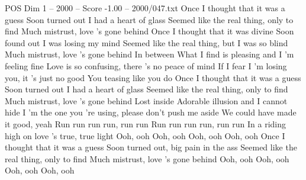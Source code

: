 \begin{textsample}{POS Dim 1 – 2000 – Score -1.00 – 2000/047.txt}  \label{ex:f1_pos_036}
Once I thought that it was a guess Soon turned out I had a heart of glass Seemed like the real thing, only to find Much mistrust, love 's gone behind Once I thought that it was divine Soon found out I was losing my mind Seemed like the real thing, but I was so blind Much mistrust, love 's gone behind In between What I find is pleasing and I 'm feeling fine Love is so confusing, there 's no peace of mind If I fear I 'm losing you, it 's just no good You teasing like you do Once I thought that it was a guess Soon turned out I had a heart of glass Seemed like the real thing, only to find Much mistrust, love 's gone behind Lost inside Adorable illusion and I cannot hide I 'm the one you 're using, please don't push me aside We could have made it good, yeah Run run run run, run run Run run run run, run run In a riding high on love 's true, true light Ooh, ooh Ooh, ooh Ooh, ooh Ooh, ooh Once I thought that it was a guess Soon turned out, big pain in the ass Seemed like the real thing, only to find Much mistrust, love 's gone behind Ooh, ooh Ooh, ooh Ooh, ooh Ooh, ooh

\end{textsample}
